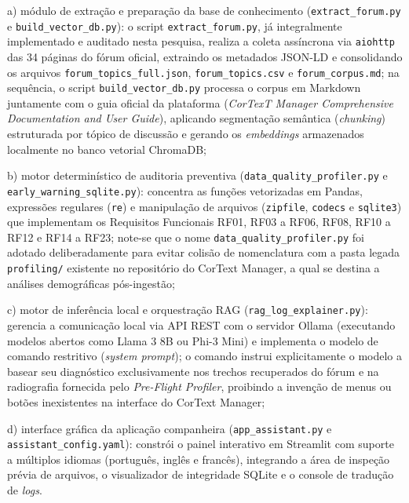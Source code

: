 \documentclass[
	oneside,
	a4paper,
	12pt,
	chapter=TITLE,
	section=TITLE,
	english,
	brazilian
]{abntex2}
\begin{document}
\par\indent a) módulo de extração e preparação da base de conhecimento (\texttt{extract\_\allowbreak forum.\allowbreak py} e \mbox{\texttt{build\_vector\_db.py}}): o script \texttt{extract\_\allowbreak forum.\allowbreak py}, já integralmente implementado e auditado nesta pesquisa, realiza a coleta assíncrona via \texttt{aiohttp} das 34 páginas do fórum oficial, extraindo os metadados JSON-LD e consolidando os arquivos \texttt{forum\_\allowbreak topics\_\allowbreak full.\allowbreak json}, \texttt{forum\_\allowbreak topics.\allowbreak csv} e \texttt{forum\_\allowbreak corpus.\allowbreak md}; na sequência, o script \mbox{\texttt{build\_vector\_db.py}} processa o corpus em Markdown juntamente com o guia oficial da plataforma (\textit{CorTexT Manager Comprehensive Documentation and User Guide}), aplicando segmentação semântica (\textit{chunking}) estruturada por tópico de discussão e gerando os \textit{embeddings} armazenados localmente no banco vetorial ChromaDB;
\par\indent b) motor determinístico de auditoria preventiva (\texttt{data\_\allowbreak quality\_\allowbreak profiler.\allowbreak py} e \texttt{early\_\allowbreak warning\_\allowbreak sqlite.\allowbreak py}): concentra as funções vetorizadas em Pandas, expressões regulares (\texttt{re}) e manipulação de arquivos (\texttt{zipfile}, \texttt{codecs} e \texttt{sqlite3}) que implementam os Requisitos Funcionais RF01, RF03 a RF06, RF08, RF10 a RF12 e RF14 a RF23; note-se que o nome \texttt{data\_\allowbreak quality\_\allowbreak profiler.\allowbreak py} foi adotado deliberadamente para evitar colisão de nomenclatura com a pasta legada \texttt{profiling/} existente no repositório do CorText Manager, a qual se destina a análises demográficas pós-ingestão;
\par\indent c) motor de inferência local e orquestração RAG (\texttt{rag\_\allowbreak log\_\allowbreak explainer.\allowbreak py}): gerencia a comunicação local via API REST com o servidor Ollama (executando modelos abertos como Llama 3 8B ou Phi-3 Mini) e implementa o modelo de comando restritivo (\textit{system prompt}); o comando instrui explicitamente o modelo a basear seu diagnóstico exclusivamente nos trechos recuperados do fórum e na radiografia fornecida pelo \textit{Pre-Flight Profiler}, proibindo a invenção de menus ou botões inexistentes na interface do CorText Manager;
\par\indent d) interface gráfica da aplicação companheira (\texttt{app\_\allowbreak assistant.\allowbreak py} e \texttt{assistant\_\allowbreak config.\allowbreak yaml}): constrói o painel interativo em Streamlit com suporte a múltiplos idiomas (português, inglês e francês), integrando a área de inspeção prévia de arquivos, o visualizador de integridade SQLite e o console de tradução de \textit{logs}.
\end{document}
